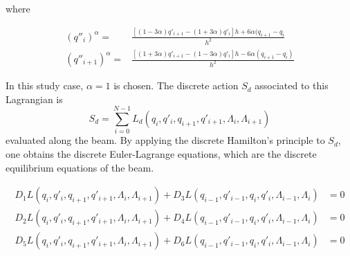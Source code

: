 where

\begin{align}
    (q''_i)^{\alpha} =& \frac{\left[ (1-3\alpha) q'_{i+1} - (1+3\alpha) q'_i \right] h + 6 \alpha (q_{i+1} - q_i}{h^2} \\
    (q''_{i+1})^{\alpha} =& \frac{\left[ (1+3\alpha) q'_{i+1} - (1-3\alpha) q'_i \right] h - 6 \alpha (q_{i+1} - q_i)}{h^2}
\end{align}


In this study case, $\alpha=1$ is chosen. The discrete action $S_d$ associated to this Lagrangian is
\begin{equation}
    S_d = \sum_{i=0}^{N-1} L_d \left( q_i, q'_i, q_{i+1}, q'_{i+1}, \Lambda_i, \Lambda_{i+1} \right)
\end{equation}
evaluated along the beam. By applying the discrete Hamilton's principle to $S_d$, one obtains the discrete Euler-Lagrange equations, which are the discrete equilibrium equations of the beam.

\begin{equation} 
\begin{split}
    D_1 L \left( q_i,q'_i,q_{i+1},q'_{i+1},\Lambda_{i},\Lambda_{i+1} \right) + D_3 L \left( q_{i-1},q'_{i-1},q_i,q'_i,\Lambda_{i-1}, \Lambda_{i} \right) &= 0 \\
    D_2 L \left( q_i,q'_i,q_{i+1},q'_{i+1},\Lambda_{i},\Lambda_{i+1} \right) + D_4 L \left( q_{i-1},q'_{i-1},q_i,q'_i,\Lambda_{i-1},\Lambda_{i} \right) &= 0 \\
    D_5 L \left( q_i,q'_i,q_{i+1},q'_{i+1},\Lambda_{i},\Lambda_{i+1} \right) + D_6 L \left( q_{i-1},q'_{i-1},q_i,q'_i,\Lambda_{i-1},\Lambda_{i} \right) &= 0
\end{split}
\end{equation}